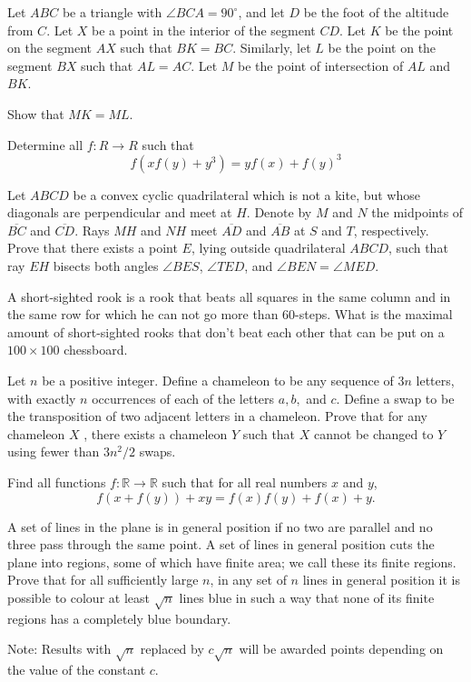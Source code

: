 \documentclass[11pt]{scrartcl}
\begin{document}
\begin{problem}[88510326676078]
	Let $ABC$ be a triangle with $\angle BCA=90^{\circ}$, and let $D$ be the foot of the altitude from $C$. Let $X$ be a point in the interior of the segment $CD$. Let $K$ be the point on the segment $AX$ such that $BK=BC$. Similarly, let $L$ be the point on the segment $BX$ such that $AL=AC$. Let $M$ be the point of intersection of $AL$ and $BK$.

Show that $MK=ML$.
\end{problem}
\begin{problem}[93917830892352]
	Determine all $ f:R\rightarrow R $ such that
$$ f(xf(y)+y^3)=yf(x)+f(y)^3 $$
\end{problem}
\begin{problem}[102296866595865]
	Let $ABCD$ be a convex cyclic quadrilateral which is not a kite, but whose diagonals are perpendicular and meet at $H$. Denote by $M$ and $N$ the midpoints of $\overline{BC}$ and $\overline{CD}$. Rays $MH$ and $NH$ meet $\overline{AD}$ and $\overline{AB}$ at $S$ and $T$, respectively. Prove that there exists a point $E$, lying outside quadrilateral $ABCD$, such that
ray $EH$ bisects both angles $\angle BES$, $\angle TED$, and
$\angle BEN = \angle MED$.
\end{problem}
\begin{problem}[105422576188851]
A short-sighted rook is a rook that beats all squares in the same column and in the same row for which he can not go more than $60$-steps.
What is the maximal amount of short-sighted rooks that don't beat each other that can be put on a $100\times 100$ chessboard.
\end{problem}
\begin{problem}[106106949450397]
Let $n$ be a positive integer. Define a chameleon to be any sequence of $3n$ letters, with exactly $n$ occurrences of each of the letters $a, b,$ and $c$. Define a swap to be the transposition of two adjacent letters in a chameleon. Prove that for any chameleon $X$ , there exists a chameleon $Y$ such that $X$ cannot be changed to $Y$ using fewer than $3n^2/2$ swaps.
\end{problem}
\begin{problem}[106666027438734]
Find all functions $f : \mathbb{R}\to\mathbb{R}$ such that for all real numbers $x$ and $y$,
$$f(x+f(y))+xy=f(x)f(y)+f(x)+y.$$
\end{problem}
\begin{problem}[116786407849814]
A set of lines in the plane is in general position if no two are parallel and no three pass through the same point. A set of lines in general position cuts the plane into regions, some of which have finite area; we call these its finite regions. Prove that for all sufficiently large $n$, in any set of $n$ lines in general position it is possible to colour at least $\sqrt{n}$ lines blue in such a way that none of its finite regions has a completely blue boundary.

Note: Results with $\sqrt{n}$ replaced by $c\sqrt{n}$ will be awarded points depending on the value of the constant $c$.
\end{problem}
\end{document}
